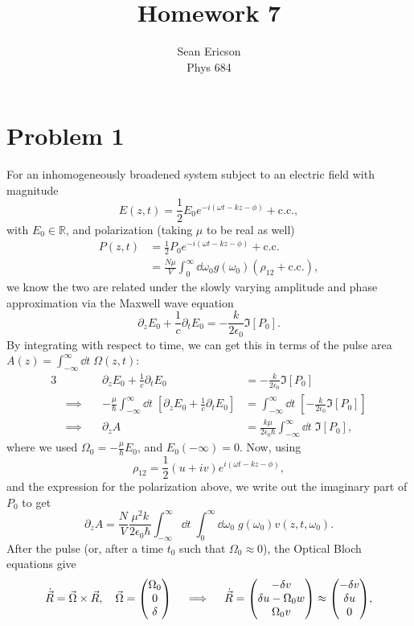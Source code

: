 \documentclass[12pt]{article}
\newcommand{\fullint}[1][x]{\int_{-\infty}^{\infty}\dd #1\;}
\newcommand{\halfint}[1][x]{\int_{0}^{\infty}\dd #1\;}
\begin{document}
	
\title{Homework 7}
\author{Sean Ericson \\ Phys 684}
\maketitle

\section*{Problem 1}
For an inhomogeneously broadened system subject to an electric field with magnitude
\[ E(z,t) = \frac{1}{2}E_0e^{-i(\omega t - kz - \phi)} + \text{c.c.}, \]
with $E_0 \in \mathbb{R}$, and polarization (taking $\mu$ to be real as well)
\begin{align*}
	P(z,t) &= \frac{1}{2}P_0e^{-i(\omega t -kz -\phi)} + \text{c.c.} \\
	&= \frac{N\mu}{V}\int_0^\infty\dd\omega_0 g(\omega_0)\left(\rho_{12} + \text{c.c.}\right),
\end{align*}
we know the two are related under the slowly varying amplitude and phase approximation via the Maxwell wave equation
\[ \partial_z E_0 + \frac{1}{c}\partial_t E_0 = -\frac{k}{2\epsilon_0}\Im[P_0]. \]
By integrating with respect to time, we can get this in terms of the pulse area $A(z) = \fullint[t]\Omega(z,t)$:
\begin{alignat*}{3}
	&\quad & \partial_z E_0 + \frac{1}{c}\partial_t E_0 &= -\frac{k}{2\epsilon_0}\Im[P_0] \\
	&\implies\quad & -\frac{\mu}{\hbar}\fullint[t]\left[\partial_z E_0 + \frac{1}{c}\partial_t E_0\right] &= \fullint[t]\left[-\frac{k}{2\epsilon_0}\Im[P_0]\right] \\
	&\implies\quad & \partial_z A &= \frac{k\mu}{2\epsilon_0\hbar}\fullint[t]\Im[P_0],
\end{alignat*}
where we used $\Omega_0 = -\frac{\mu}{\hbar}E_0$, and $E_0(-\infty) =0$.
Now, using
\[ \rho_{12} = \frac{1}{2}(u + iv)e^{i(\omega t - kz -\phi)}, \]
and the expression for the polarization above, we write out the imaginary part of $P_0$ to get
\[ \partial_zA = \frac{N}{V}\frac{\mu^2k}{2\epsilon_0\hbar}\fullint[t]\halfint[\omega_0]g(\omega_0)v(z,t,\omega_0). \]
After the pulse (or, after a time $t_0$ such that $\Omega_0\approx 0$), the Optical Bloch equations give
\[ \dot{\vec{R}} = \vec\Omega \times \vec{R}, \quad \vec\Omega = \mqty(\Omega_0\\0\\\delta) \quad \implies \quad \dot{\vec{R}} = \mqty(-\delta v \\ \delta u - \Omega_0 w \\ \Omega_0 v)\approx\mqty(-\delta v\\\delta u\\0), \]
\end{document}
